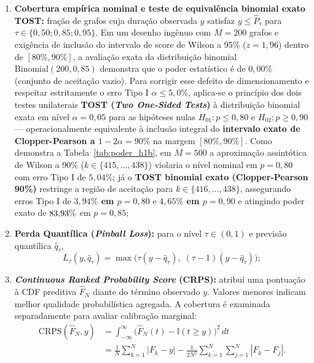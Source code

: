 \documentclass[12pt,openany,oneside,a4paper,english,brazilian,sumario=tradicional]{abntex2}
\begin{document}
\begin{itemize}
\begin{enumerate}
    \item \textbf{Cobertura empírica nominal e teste de equivalência binomial exato TOST:} fração de grafos cuja duração observada $y$ satisfaz $y \le \hat{P}_{\tau}$ para $\tau \in \{0{,}50; 0{,}85; 0{,}95\}$. Em um desenho ingênuo com $M=200$ grafos e exigência de inclusão do intervalo de score de Wilson \cite{wilson1927} a 95\% ($z=1{,}96$) dentro de $[80\%, 90\%]$, a avaliação exata da distribuição binomial $\mathrm{Binomial}(200, 0{,}85)$ demonstra que o poder estatístico é de \textbf{$0{,}00\%$} (conjunto de aceitação vazio). Para corrigir esse defeito de dimensionamento e respeitar estritamente o erro Tipo I $\alpha \le 5{,}0\%$, aplica-se o princípio dos dois testes unilaterais \textbf{TOST (\textit{Two One-Sided Tests})} \cite{schuirmann1987} à distribuição binomial exata em nível $\alpha=0{,}05$ para as hipóteses nulas $H_{01}\colon p \le 0{,}80$ e $H_{02}\colon p \ge 0{,}90$ --- operacionalmente equivalente à inclusão integral do \textbf{intervalo exato de Clopper-Pearson \cite{clopper1934} a $1 - 2\alpha = 90\%$} na margem $[80\%, 90\%]$. Como demonstra a Tabela~\ref{tab:poder_h1b}, em $M=500$ a aproximação assintótica de Wilson a 90\% ($k \in \{415,\dots,438\}$) violaria o nível nominal em $p=0{,}80$ com erro Tipo I de $5{,}04\%$; já o \textbf{TOST binomial exato (Clopper-Pearson 90\%)} restringe a região de aceitação para \textbf{$k \in \{416,\dots,438\}$}, assegurando erros Tipo I de \textbf{$3{,}94\%$ em $p=0{,}80$} e \textbf{$4{,}65\%$ em $p=0{,}90$} e atingindo poder exato de \textbf{$83{,}93{}\%$} em $p=0{,}85$;
    \item \textbf{Perda Quantílica (\textit{Pinball Loss}):} para o nível $\tau \in (0,1)$ e previsão quantílica $\hat{q}_\tau$,
    \begin{equation}
    L_{\tau}(y, \hat{q}_\tau) = \max\big(\tau(y - \hat{q}_\tau),\; (\tau - 1)(y - \hat{q}_\tau)\big);
    \end{equation}
    \item \textbf{\textit{Continuous Ranked Probability Score} (CRPS):} atribui uma pontuação à CDF preditiva $\hat{F}_N$ diante do término observado $y$. Valores menores indicam melhor qualidade probabilística agregada. A cobertura é examinada separadamente para avaliar calibração marginal:
    \begin{equation}
    \begin{aligned}
    \mathrm{CRPS}(\hat{F}_N, y) &= \int_{-\infty}^{\infty} \big(\hat{F}_N(t) - \mathbb{I}(t \ge y)\big)^2\,dt \\
    &= \frac{1}{N}\sum_{k=1}^N |F_k - y| - \frac{1}{2N^2}\sum_{k=1}^N\sum_{j=1}^N |F_k - F_j|.
    \end{aligned}
    \end{equation}
  \end{enumerate}
\end{itemize}
\end{document}
